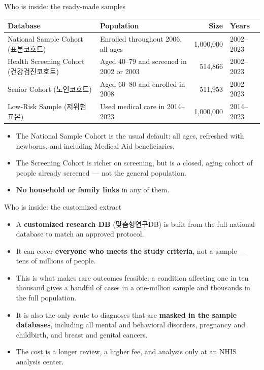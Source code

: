 \documentclass[aspectratio=169,11pt]{beamer}
\newcommand{\hl}[1]{\textbf{\color{kdgreen}#1}}
\newcommand{\han}[1]{{\footnotesize\color{kdgray}(#1)}}
\begin{document}
\begin{frame}{Who is inside: the ready-made samples}
  \vspace{-2pt}
  \renewcommand{\arraystretch}{1.3}
  {\footnotesize
  \begin{tabularx}{\textwidth}{@{}l >{\raggedright\arraybackslash}X r l@{}}
    \toprule
    \textbf{Database} & \textbf{Population} & \textbf{Size} & \textbf{Years} \\
    \midrule
    National Sample Cohort \han{표본코호트} & Enrolled throughout 2006, all ages & 1,000,000 & 2002--2023 \\
    Health Screening Cohort \han{건강검진코호트} & Aged 40--79 and screened in 2002 or 2003 & 514,866 & 2002--2023 \\
    Senior Cohort \han{노인코호트} & Aged 60--80 and enrolled in 2008 & 511,953 & 2002--2023 \\
    Low-Risk Sample \han{저위험 표본} & Used medical care in 2014--2023 & 1,000,000 & 2014--2023 \\
    \bottomrule
  \end{tabularx}}
  \vspace{7pt}

  \begin{itemize}\small
    \setlength{\itemsep}{4pt}
    \item The National Sample Cohort is the usual default: all ages, refreshed with
          newborns, and including Medical Aid beneficiaries.
    \item The Screening Cohort is richer on screening, but is a closed, aging cohort
          of people already screened --- not the general population.
    \item \hl{No household or family links} in any of them.
  \end{itemize}
\end{frame}

\begin{frame}{Who is inside: the customized extract}
  \begin{itemize}
    \setlength{\itemsep}{9pt}
    \item A \hl{customized research DB} \han{맞춤형연구DB} is built from the full national
          database to match an approved protocol.
    \item It can cover \hl{everyone who meets the study criteria}, not a sample ---
          tens of millions of people.
    \item This is what makes rare outcomes feasible: a condition affecting one in
          ten thousand gives a handful of cases in a one-million sample and
          thousands in the full population.
    \item It is also the only route to diagnoses that are \hl{masked in the sample
          databases}, including all mental and behavioral disorders, pregnancy and
          childbirth, and breast and genital cancers.
    \item The cost is a longer review, a higher fee, and analysis only at an
          NHIS analysis center.
  \end{itemize}
\end{frame}
\end{document}
